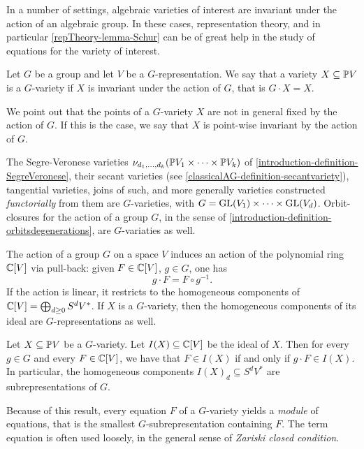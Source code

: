 In a number of settings, algebraic varieties of interest are invariant under the action of an algebraic group. In these cases, representation theory, and in particular \ref{repTheory-lemma-Schur} can be of great help in the study of equations for the variety of interest.

\begin{definition}
 \label{repTheory-definition-Gvariety}
 Let $G$ be a group and let $V$ be a $G$-representation. We say that a variety $X \subseteq \mathbb{P} V$ is a $G$-variety if $X$ is invariant under the action of $G$, that is $G \cdot X = X$. 
\end{definition}
We point out that the points of a $G$-variety $X$ are not in general fixed by the action of $G$. If this is the case, we say that $X$ is point-wise invariant by the action of $G$.

The Segre-Veronese varieties $\nu_{d_1 , \ldots , d_k} ( \mathbb{P} V_1 \times \cdots \times \mathbb{P} V_k)$ of \ref{introduction-definition-SegreVeronese}, their secant varieties (see \ref{classicalAG-definition-secantvariety}), tangential varieties, joins of such, and more generally varieties constructed \emph{functorially} from them are $G$-varieties, with $G = \mathrm{GL}(V_1) \times \cdots \times \mathrm{GL}(V_d)$. Orbit-closures for the action of a group $G$, in the sense of \ref{introduction-definition-orbitsdegenerations}, are $G$-variaties as well.

The action of a group $G$ on a space $V$ induces an action of the polynomial ring $\mathbb{C}[V]$ via pull-back: given $F \in \mathbb{C}[V]$, $g \in G$, one has 
\[
g \cdot F = F \circ g^{-1}.
\]
If the action is linear, it restricts to the homogeneous components of $\mathbb{C}[V] = \bigoplus_{d \geq 0} S^d V^*$. If $X$ is a $G$-variety, then the homogeneous components of its ideal are $G$-representations as well.
\begin{lemma}
\label{repTheory-lemma-GactionOnIdeal}
 Let $X \subseteq \mathbb{P} V$ be a $G$-variety. Let $I(X) \subseteq \mathbb{C}[V]$ be the ideal of $X$. Then for every $g \in G$ and every $F \in \mathbb{C}[V]$, we have that $F \in I(X)$ if and only if $g \cdot F \in I(X)$. In particular, the homogeneous components $I(X)_d \subseteq  S^d V^*$ are subrepresentations of $G$.
\end{lemma}
Because of this result, every equation $F$ of a $G$-variety yields a \emph{module} of equations, that is the smallest $G$-subrepresentation containing $F$. The term equation is often used loosely, in the general sense of \emph{Zariski closed condition}.

